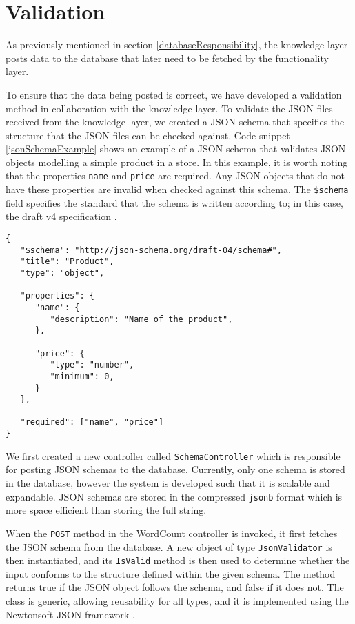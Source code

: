 \section{Validation}

As previously mentioned in section \ref{databaseResponsibility}, the knowledge layer posts data to the database that later need to be fetched by the functionality layer.

To ensure that the data being posted is correct, we have developed a validation method in collaboration with the knowledge layer.
To validate the JSON files received from the knowledge layer, we created a JSON schema that specifies the structure that the JSON files can be checked against. 
Code snippet \ref{jsonSchemaExample} shows an example of a JSON schema that validates JSON objects modelling a simple product in a store. In this example, it is worth noting that the properties \texttt{name} and \texttt{price} are required. Any JSON objects that do not have these properties are invalid when checked against this schema. The \texttt{\$schema} field specifies the standard that the schema is written according to; in this case, the draft v4 specification \cite{tutorialspoint_jsonschema}.

\begin{lstlisting}[language=CSharp, caption={An example of a basic JSON schema.}, label={lst:jsonSchemaExample}]
{
   "$schema": "http://json-schema.org/draft-04/schema#",
   "title": "Product",
   "type": "object",
	
   "properties": {		
      "name": {
         "description": "Name of the product",
      },
		
      "price": {
         "type": "number",
         "minimum": 0,
      }
   },
	
   "required": ["name", "price"]
}
\end{lstlisting}

We first created a new controller called \texttt{SchemaController} which is responsible for posting JSON schemas to the database. 
Currently, only one schema is stored in the database, however the system is developed such that it is scalable and expandable.
JSON schemas are stored in the compressed \texttt{jsonb} format which is more space efficient than storing the full string.

When the \texttt{POST} method in the WordCount controller is invoked, it first fetches the JSON schema from the database.
A new object of type \texttt{JsonValidator} is then instantiated, and its \texttt{IsValid} method is then used to determine whether the input conforms to the structure defined within the given schema. 
The method returns true if the JSON object follows the schema, and false if it does not.
The class is generic, allowing reusability for all types, and it is implemented using the Newtonsoft JSON framework \cite{Json.NET}. 

